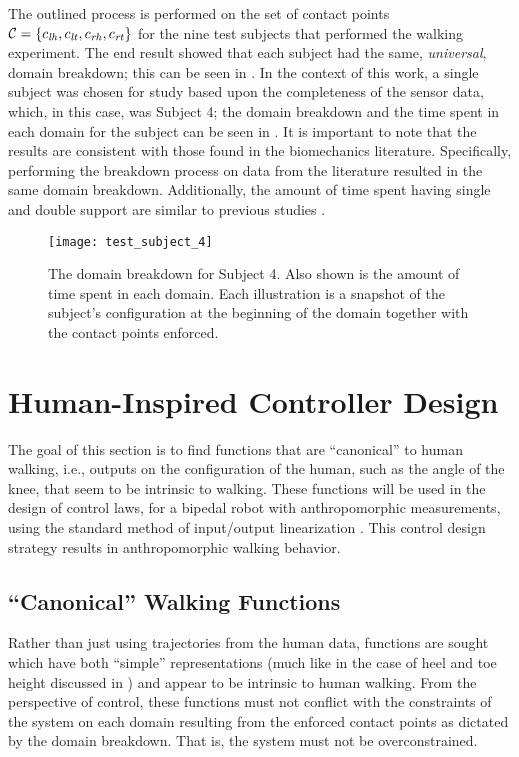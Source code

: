 The outlined process is performed on the set of contact points $\mathcal{C} =  \{c_{\mathit{lh}},
c_{\mathit{lt}}, c_{\mathit{rh}} , c_{\mathit{rt}}\}$ for the nine test subjects that performed the walking
experiment.
%
The end result showed that each subject had the same, {\em universal}, domain
breakdown; this can be seen in .
%
In the context of this work, a single subject was chosen for study based upon
the completeness of the sensor data, which, in this case, was Subject 4; the
domain breakdown and the time spent in each domain for the subject can be seen
in .
%
It is important to note that the results are consistent with those found in the biomechanics
literature.
%
Specifically, performing the breakdown process on data from the literature
\cite{Winter2009} resulted in the same domain breakdown.
%
Additionally, the amount of time spent having single and double support are
similar to previous studies \cite{Ackermann2007}.

\begin{figure}[t]
  \centering
  \texttt{[image: test\_subject\_4]}
  \caption[The domain breakdown for Subject 4.]{The domain breakdown for Subject
    4.
    Also shown is the amount of time spent in each domain.
    Each illustration is a snapshot of the subject's configuration at the
    beginning of the domain together with the contact points enforced.}
  \label{fred}
\end{figure}


\section{Human-Inspired Controller Design}

The goal of this section is to find functions that are ``canonical'' to human
walking, i.e., outputs on the configuration of the human, such as the angle of
the knee, that seem to be intrinsic to walking.
%
These functions will be used in the design of control laws, for a bipedal robot
with anthropomorphic measurements, using the standard method of input/output
linearization \cite{Sastry1999}.
%
This control design strategy results in anthropomorphic walking behavior.


\subsection{``Canonical'' Walking Functions} \label{sec:functions}

Rather than just using trajectories from the human data, functions are sought
which have both ``simple'' representations (much like in the case of heel and
toe height discussed in ) and appear to be intrinsic
to human walking.
%
From the perspective of control, these functions must not conflict with the
constraints of the system on each domain resulting from the enforced contact
points as dictated by the domain breakdown.
%
That is, the system must not be overconstrained.

